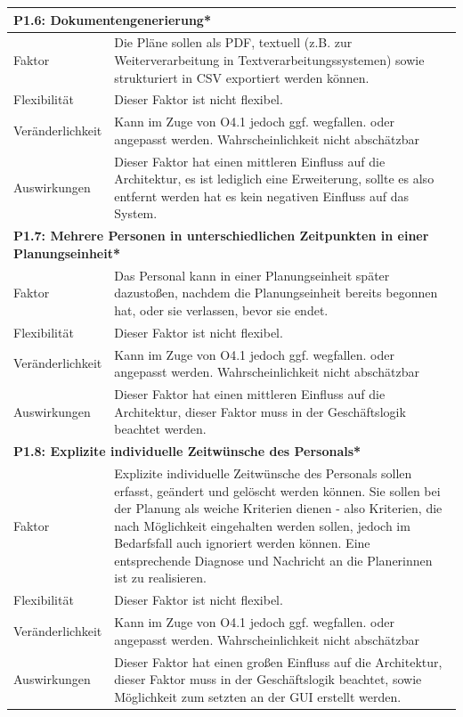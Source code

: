 \documentclass[fontsize=12pt,paper=a4,twoside]{scrartcl}
\begin{document}
\begin{tabularx}{\textwidth}{|l|X|}
\hline
\multicolumn{2}{|l|}{\textbf{P1.6: Dokumentengenerierung*}}\\\hline
Faktor & Die Pläne sollen als PDF, textuell (z.B. zur Weiterverarbeitung in Textverarbeitungssystemen) sowie strukturiert in CSV exportiert werden können. \\\hline
Flexibilität & Dieser Faktor ist nicht flexibel. \\\hline
Veränderlichkeit & Kann im Zuge von O4.1 jedoch ggf. wegfallen. oder angepasst werden.  Wahrscheinlichkeit nicht abschätzbar \\\hline
Auswirkungen & Dieser Faktor hat einen mittleren Einfluss auf die Architektur, es ist lediglich eine Erweiterung, sollte es also entfernt werden hat es kein negativen Einfluss auf das System. \\\hline
\multicolumn{2}{|p{\dimexpr\textwidth-2\tabcolsep\relax}|}{\textbf{P1.7: Mehrere Personen in unterschiedlichen Zeitpunkten in einer Planungseinheit*}}\\\hline
Faktor & Das Personal kann in einer Planungseinheit später dazustoßen, nachdem die Planungseinheit bereits begonnen hat, oder sie verlassen, bevor sie endet. \\\hline
Flexibilität & Dieser Faktor ist nicht flexibel. \\\hline
Veränderlichkeit & Kann im Zuge von O4.1 jedoch ggf. wegfallen. oder angepasst werden.  Wahrscheinlichkeit nicht abschätzbar \\\hline
Auswirkungen & Dieser Faktor hat einen mittleren Einfluss auf die Architektur, dieser Faktor muss in der Geschäftslogik beachtet werden. \\\hline
\multicolumn{2}{|l|}{\textbf{P1.8: Explizite individuelle Zeitwünsche des Personals*}}\\\hline
Faktor & Explizite individuelle Zeitwünsche des Personals sollen erfasst, geändert und gelöscht werden können. Sie sollen bei der Planung als weiche Kriterien dienen - also Kriterien, die nach Möglichkeit eingehalten werden sollen, jedoch im Bedarfsfall auch ignoriert werden können. Eine entsprechende Diagnose und Nachricht an die Planerinnen ist zu realisieren. \\\hline
Flexibilität & Dieser Faktor ist nicht flexibel. \\\hline
Veränderlichkeit & Kann im Zuge von O4.1 jedoch ggf. wegfallen. oder angepasst werden.  Wahrscheinlichkeit nicht abschätzbar \\\hline
Auswirkungen & Dieser Faktor hat einen großen Einfluss auf die Architektur, dieser Faktor muss in der Geschäftslogik beachtet, sowie Möglichkeit zum setzten an der GUI erstellt werden.  \\\hline
\end{tabularx} \newpage
\end{document}
